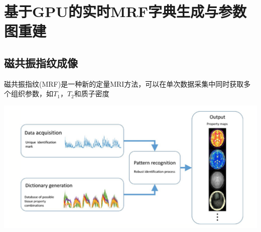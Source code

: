 \documentclass{beamer}
\begin{document}
\section{基于GPU的实时MRF字典生成与参数图重建}
    \begin{frame}
    \end{frame}

\subsection{磁共振指纹成像}
\begin{frame}
磁共振指纹(MRF)是一种新的定量MRI方法，可以在单次数据采集中同时获取多个组织参数，如$T_1$，$T_2$和质子密度
	\begin{minipage}{1\textwidth}
\centerline{\includegraphics[width=1.2\textwidth]{../img/intro/mrf.png}}
\end{minipage}
\end{frame}

\end{document}
